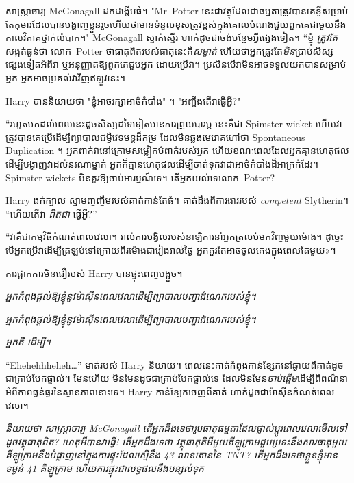 សាស្រ្តាចារ្យ McGonagall ដកដង្ហើមធំ។ "Mr~Potter នេះ​ជា​វត្ថុ​ដែល​ជា​ធម្មតា​ត្រូវ​បាន​គេ​ខ្ចី​សម្រាប់​តែ​កុមារ​ដែល​បាន​បង្ហាញ​ខ្លួន​រួច​ហើយ​ថា​មាន​ទំនួល​ខុស​ត្រូវ​ខ្ពស់​ក្នុង​គោល​បំណង​ជួយ​ពួក​គេ​ជាមួយ​នឹង​កាលវិភាគ​ថ្នាក់​លំបាក​។" McGonagall ស្ទាក់ស្ទើរ ហាក់ដូចជាចង់បន្ថែមអ្វីផ្សេងទៀត។ “ខ្ញុំ \emph{ត្រូវតែ} សង្កត់ធ្ងន់ថា លោក~Potter ថាធាតុពិតរបស់ធាតុនេះគឺ\emph{សម្ងាត់} ហើយថាអ្នកត្រូវតែ\emph{មិន}ប្រាប់សិស្សផ្សេងទៀតអំពីវា ឬអនុញ្ញាតឱ្យពួកគេជួបអ្នក ដោយប្រើវា។ ប្រសិន​បើ​វា​មិន​អាច​ទទួល​យក​បាន​សម្រាប់​អ្នក អ្នក​អាច​ប្រគល់​វា​វិញ​ឥឡូវ​នេះ។

Harry បាននិយាយថា "ខ្ញុំអាចរក្សាអាថ៌កំបាំង" ។ "អញ្ចឹងតើវាធ្វើអ្វី?"

“រហូតមកដល់ពេលនេះដូចសិស្សដទៃទៀតមានការព្រួយបារម្ភ នេះគឺជា Spimster wicket ហើយវាត្រូវបានគេប្រើដើម្បីព្យាបាលជម្ងឺវេទមន្តដ៏កម្រ ដែលមិនឆ្លងមេរោគហៅថា Spontaneous Duplication ។ អ្នកពាក់វានៅក្រោមសម្លៀកបំពាក់របស់អ្នក ហើយខណៈពេលដែលអ្នកគ្មានហេតុផលដើម្បីបង្ហាញវាដល់នរណាម្នាក់ អ្នកក៏គ្មានហេតុផលដើម្បីចាត់ទុកវាជាអាថ៌កំបាំងដ៏អាក្រក់ដែរ។ Spimster wickets មិនគួរឱ្យចាប់អារម្មណ៍ទេ។ តើអ្នកយល់ទេលោក~Potter?

Harry ងក់ក្បាល ស្នាមញញឹមរបស់គាត់កាន់តែធំ។ គាត់ដឹងពីការងាររបស់ \emph{competent} Slytherin។ “ហើយតើវា \emph{ពិតជា} ធ្វើអ្វី?”

“វាគឺជាកម្មវិធីកំណត់ពេលវេលា។ រាល់ការបង្វិលរបស់នាឡិការនាំអ្នកត្រលប់មកវិញមួយម៉ោង។ ដូច្នេះ​បើ​អ្នក​ប្រើ​វា​ដើម្បី​ត្រឡប់​ទៅ​ក្រោយ​ពីរ​ម៉ោង​ជា​រៀង​រាល់​ថ្ងៃ អ្នក​គួរ​តែ​អាច​ចូល​គេង​ក្នុង​ពេល​តែ​មួយ»។

ការ​ផ្អាក​ការ​មិន​ជឿ​របស់ Harry បាន​ផ្ទុះ​ពេញ​បង្អួច។

\emph{អ្នកកំពុងផ្តល់ឱ្យខ្ញុំនូវម៉ាស៊ីនពេលវេលាដើម្បីព្យាបាលបញ្ហាដំណេករបស់ខ្ញុំ។}

\emph{អ្នកកំពុងផ្តល់ឱ្យខ្ញុំនូវ\emph{ម៉ាស៊ីនពេលវេលា}ដើម្បីព្យាបាល\emph{បញ្ហាដំណេក}របស់ខ្ញុំ។}

\emph{អ្នកគឺ  ដើម្បី។}

“Ehehehhheheh…” មាត់របស់ Harry និយាយ។ ពេល​នេះ​គាត់​កំពុង​កាន់​ខ្សែ​ក​នៅ​ឆ្ងាយ​ពី​គាត់​ដូច​ជា​គ្រាប់​បែក​ផ្ទាល់។ មែនហើយ មិនមែនដូចជាគ្រាប់បែកផ្ទាល់ទេ ដែលមិនមែន\emph{ចាប់ផ្តើម}ដើម្បីពិពណ៌នាអំពីភាពធ្ងន់ធ្ងរនៃស្ថានភាពនោះទេ។ Harry កាន់ខ្សែកចេញពីគាត់ ហាក់ដូចជាម៉ាស៊ីនកំណត់ពេលវេលា។

\emph{និយាយថា សាស្រ្តាចារ្យ McGonagall តើអ្នកដឹងទេថារូបធាតុធម្មតាដែលផ្លាស់ប្តូរពេលវេលាមើលទៅដូចវត្ថុធាតុពិត? ហេតុអីបានវាធ្វើ! តើអ្នកដឹងទេថា វត្ថុធាតុគីមីមួយគីឡូក្រាមជួបប្រទះនឹងសារធាតុមួយគីឡូក្រាមនឹងបំផ្លាញនៅក្នុងការផ្ទុះដែលស្មើនឹង 43 លានតោននៃ TNT? តើ​អ្នក​ដឹង​ទេ​ថា​ខ្លួន​ខ្ញុំ​មាន​ទម្ងន់ 41 គីឡូក្រាម ហើយ​ការ​ផ្ទុះ​ជា​លទ្ធផល​នឹង​បន្សល់​ទុក }

